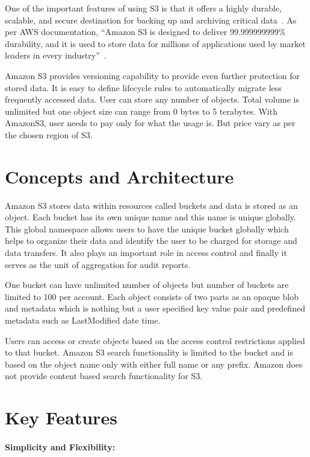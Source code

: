 One of the important features of using S3 is that it offers a highly durable,
scalable, and secure destination for backing up and archiving critical
data~\cite{hid-sp18-420-amazon-S3}. As per AWS documentation, ``Amazon S3 is
designed to deliver 99.999999999\% durability, and it is used to store data for
millions of applications used by market leaders in every
industry''~\cite{hid-sp18-420-amazon-S3}.

Amazon S3 provides versioning capability to provide even further protection for
stored data. It is easy to define lifecycle rules to automatically migrate less
frequently accessed data. User can store any number of objects. Total volume is
unlimited but one object size can range from 0 bytes to 5 terabytes. With
AmazonS3, user needs to pay only for what the usage is. But price vary as per
the chosen region of S3.



\section{Concepts and Architecture}

Amazon S3 stores data within resources called buckets and data is stored as an
object. Each bucket has its own unique name and this name is unique globally.
This global namespace allows users to have the unique bucket globally which
helps to organize their data and identify the user to be charged for storage
and data transfers. It also plays an important role in access control and
finally it serves as the unit of aggregation for audit reports.


One bucket can have unlimited number of objects but number of buckets are
limited to 100 per account. Each object consists of two parts as an opaque blob
and metadata which is nothing but a user specified key value pair and
predefined metadata such as LastModified date time.


Users can access or create objects based on the access control restrictions
applied to that bucket. Amazon S3 search functionality is limited to the bucket
and is based on the object name only with either full name or any prefix.
Amazon does not provide content based search functionality for S3.



\section{Key Features}

\paragraph{Simplicity and Flexibility: } 

